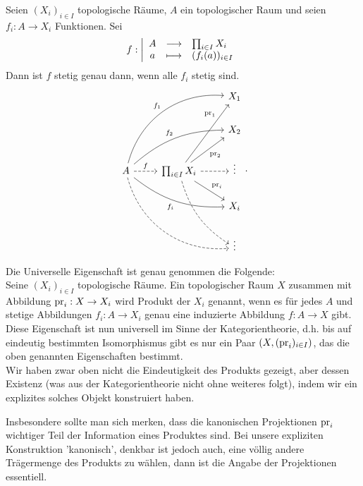 
\begin{theorem}\label{thm:universelle-eigenschaft-des-produkts}
    Seien $(X_i)_{i\in I}$ topologische Räume, $A$ ein topologischer Raum und seien $f_i : A \to  X_i$ Funktionen. Sei
        \begin{equation*}
        f: \left| \begin{array}{c c l} 
        A & \longrightarrow & \prod_{i \in I} X_i \\
        a & \longmapsto &  (f_i(a))_{i \in I}
        \end{array} \right.
    \end{equation*}
    Dann ist $f$ stetig genau dann, wenn alle  $f_i$ stetig sind.
    \[
    \begin{tikzcd}
        & & X_1 \\
        & & X_2 \\
    A \ar[dashed]{r}{f} \ar[bend left = 40]{uurr}{f_1} \ar[bend left = 20]{urr}{f_2} \ar[bend right = 20,swap]{drr}{f_i} \ar[dashed, bend right = 40]{ddrr}& \prod_{i \in I}X_i \ar[near end]{uru}{\pr_1} \ar[swap]{ur}{\pr_2} \ar{dr}{\pr_i} \ar[bend right = 20,dashed]{ddr} \ar[dashed]{r}& \vdots \\
          & & X_i \\
          & & \vdots
    \end{tikzcd}
    .\] 
\end{theorem}
\begin{remark*}
    Die Universelle Eigenschaft ist genau genommen die Folgende: \\
    Seine $(X_i)_{i \in I}$ topologische Räume. Ein topologischer Raum $X$  zusammen mit Abbildung  $\operatorname{pr}_i : X \to  X_i$ wird Produkt der $X_i$ genannt, wenn es für jedes  $A$ und stetige Abbildungen  $f_i : A \to  X_i$ genau eine induzierte Abbildung $f: A \to  X$ gibt. \\
    Diese Eigenschaft ist nun universell im Sinne der Kategorientheorie, d.h. bis auf eindeutig bestimmten Isomorphismus gibt es nur ein Paar $(X, (\operatorname{pr}_i)_{i \in I})$, das die oben genannten Eigenschaften bestimmt. \\
    Wir haben zwar oben nicht die Eindeutigkeit des Produkts gezeigt, aber dessen Existenz (was aus der Kategorientheorie nicht ohne weiteres folgt), indem wir ein explizites solches Objekt konstruiert haben.
\end{remark*}
\begin{remark*}
    Insbesondere sollte man sich merken, dass die kanonischen Projektionen $\operatorname{pr}_i$ wichtiger Teil der Information eines Produktes sind. Bei unsere expliziten Konstruktion 'kanonisch', denkbar ist jedoch auch, eine völlig andere Trägermenge des Produkts zu wählen, dann ist die Angabe der Projektionen essentiell.
\end{remark*}
